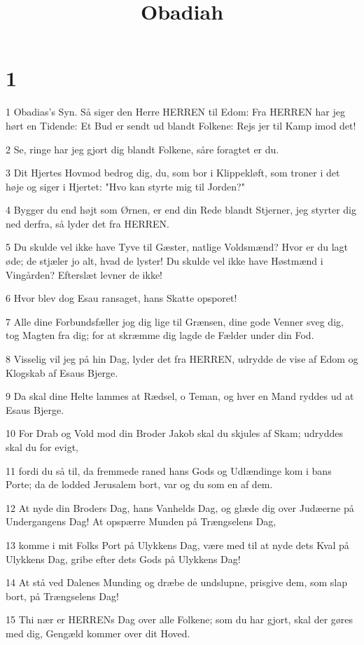 

\title{Obadiah}


\chapter{1}

\par 1 Obadias's Syn. Så siger den Herre HERREN til Edom: Fra HERREN har jeg hørt en Tidende: Et Bud er sendt ud blandt Folkene: Rejs jer til Kamp imod det!
\par 2 Se, ringe har jeg gjort dig blandt Folkene, såre foragtet er du.
\par 3 Dit Hjertes Hovmod bedrog dig, du, som bor i Klippekløft, som troner i det høje og siger i Hjertet: "Hvo kan styrte mig til Jorden?"
\par 4 Bygger du end højt som Ørnen, er end din Rede blandt Stjerner, jeg styrter dig ned derfra, så lyder det fra HERREN.
\par 5 Du skulde vel ikke have Tyve til Gæster, natlige Voldsmænd? Hvor er du lagt øde; de stjæler jo alt, hvad de lyster! Du skulde vel ikke have Høstmænd i Vingården? Efterslæt levner de ikke!
\par 6 Hvor blev dog Esau ransaget, hans Skatte opsporet!
\par 7 Alle dine Forbundsfæller jog dig lige til Grænsen, dine gode Venner sveg dig, tog Magten fra dig; for at skræmme dig lagde de Fælder under din Fod.
\par 8 Visselig vil jeg på hin Dag, lyder det fra HERREN, udrydde de vise af Edom og Klogskab af Esaus Bjerge.
\par 9 Da skal dine Helte lammes at Rædsel, o Teman, og hver en Mand ryddes ud at Esaus Bjerge.
\par 10 For Drab og Vold mod din Broder Jakob skal du skjules af Skam; udryddes skal du for evigt,
\par 11 fordi du så til, da fremmede raned hans Gods og Udlændinge kom i bans Porte; da de lodded Jerusalem bort, var og du som en af dem.
\par 12 At nyde din Broders Dag, hans Vanhelds Dag, og glæde dig over Judæerne på Undergangens Dag! At opspærre Munden på Trængselens Dag,
\par 13 komme i mit Folks Port på Ulykkens Dag, være med til at nyde dets Kval på Ulykkens Dag, gribe efter dets Gods på Ulykkens Dag!
\par 14 At stå ved Dalenes Munding og dræbe de undslupne, prisgive dem, som slap bort, på Trængselens Dag!
\par 15 Thi nær er HERRENs Dag over alle Folkene; som du har gjort, skal der gøres med dig, Gengæld kommer over dit Hoved.
